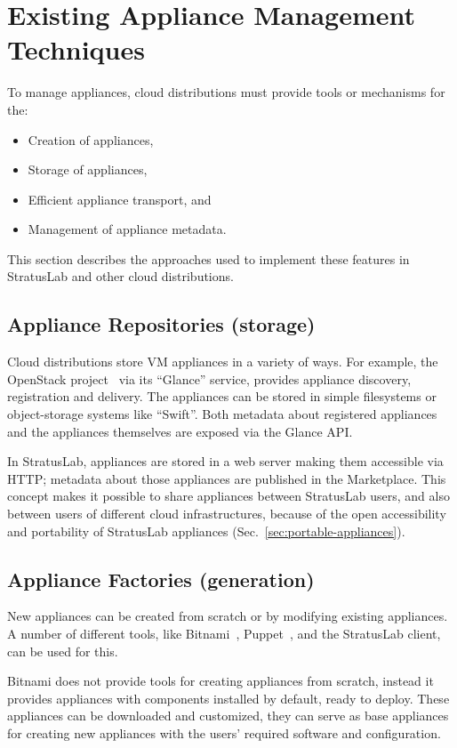 \section{Existing Appliance Management Techniques}
\label{sec:other-approaches}

To manage appliances, cloud distributions must provide tools or
mechanisms for the:
\begin{itemize}
\item Creation of appliances,
\item Storage of appliances,
\item Efficient appliance transport, and
\item Management of appliance metadata.
\end{itemize}
This section describes the approaches used to implement these features
in StratusLab and other cloud distributions.

\subsection{Appliance Repositories (storage)}

Cloud distributions store VM appliances in a variety of ways. 
For example, the OpenStack project~\cite{openstack} 
via its ``Glance'' service, provides appliance discovery, registration and delivery.
The appliances can be stored in simple filesystems or 
object-storage systems like ``Swift''\@. Both metadata about registered appliances 
and the appliances themselves are exposed via the Glance API\@.

In StratusLab, appliances are stored in a web server making them accessible via HTTP;
metadata about those appliances are published in the Marketplace\@. This concept makes it possible 
to share appliances between StratusLab users, and also between users of different cloud 
infrastructures, because of the open accessibility and portability of StratusLab appliances (Sec.~\ref{sec:portable-appliances}). 

\subsection{Appliance Factories (generation)}

New appliances can be created from scratch or by modifying existing appliances.
A number of different
tools, like Bitnami~\cite{bitnami}, Puppet~\cite{puppet}, and the StratusLab client,
can be used for this.

Bitnami does not provide tools for creating appliances from scratch,
instead it provides appliances with components installed by default, ready to deploy.
These appliances can be downloaded and customized, they can serve as 
base appliances for creating new appliances with the users' required software 
and configuration. 

